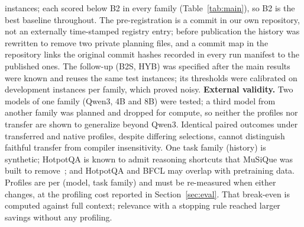 \RNWeak instances; each scored below B2 in every family (Table~\ref{tab:main}), so B2 is the best baseline throughout. The pre-registration is a commit in our own repository, not an externally time-stamped registry entry; before
publication the history was rewritten to remove two private planning files, and a commit map in the repository links the
original commit hashes recorded in every run manifest to the published ones. The follow-up (B2S, HYB) was specified after the main results were
known and reuses the same test instances; its thresholds were calibrated on \RNCalib development instances per family,
which proved noisy.
\textbf{External validity.} Two models of one family (Qwen3, 4B and 8B) were tested; a third model from another family
was planned and dropped for compute, so neither the profiles nor transfer are shown to generalize beyond Qwen3. Identical paired outcomes under transferred
and native profiles, despite differing selections, cannot distinguish faithful transfer from compiler insensitivity. One task family (history) is
synthetic; HotpotQA is known to admit reasoning shortcuts that MuSiQue was built to remove~\cite{musique2022}; and
HotpotQA and BFCL may overlap with pretraining data. Profiles are per (model, task family) and must be
re-measured when either changes, at the profiling cost reported in Section~\ref{sec:eval}. That break-even is computed
against full context; relevance with a stopping rule reached larger savings without any profiling.
